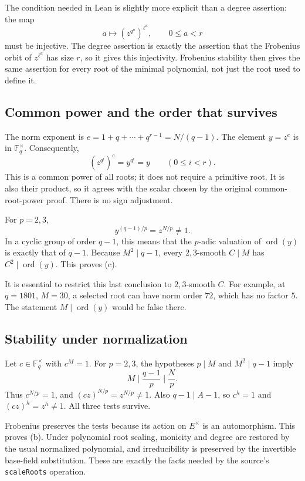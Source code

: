 \documentclass[11pt,a4paper]{article}
\theoremstyle{definition}
\theoremstyle{remark}
\newcommand{\F}{\mathbb F}
\newcommand{\ord}{\operatorname{ord}}
\newcommand{\code}[1]{{\small\nolinkurl{#1}}}
\begin{document}
The condition needed in Lean is slightly more explicit than a degree assertion:
the map
\[
    a\longmapsto (z^{q^a})^{\ell^u},\qquad 0\le a<r
\]
must be injective. The degree assertion is exactly the assertion that the
Frobenius orbit of \(z^{\ell^u}\) has size \(r\), so it gives this injectivity.
Frobenius stability then gives the same assertion for every root of the minimal
polynomial, not just the root used to define it.

\subsection{Common power and the order that survives}

The norm exponent is \(e=1+q+\cdots+q^{r-1}=N/(q-1)\).
The element \(y=z^e\) is in \(\F_q^\times\). Consequently,
\[
       (z^{q^i})^e=y^{q^i}=y
       \qquad(0\le i<r).
\]
This is a common power of all roots; it does not require a primitive root.
It is also their product, so it agrees with the scalar chosen by the original
common-root-power proof. There is no sign adjustment.

For \(p=2,3\),
\[
             y^{(q-1)/p}=z^{N/p}\ne1.
\]
In a cyclic group of order \(q-1\), this means that the \(p\)-adic valuation of
\(\ord(y)\) is exactly that of \(q-1\).
Because \(M^2\mid q-1\), every \(2,3\)-smooth \(C\mid M\) has
\(C^2\mid\ord(y)\). This proves (c).

It is essential to restrict this last conclusion to \(2,3\)-smooth \(C\).
For example, at \(q=1801\), \(M=30\), a selected root can have norm order \(72\),
which has no factor \(5\). The statement \(M\mid\ord(y)\) would be false there.

\subsection{Stability under normalization}

Let \(c\in\F_q^\times\) with \(c^M=1\).
For \(p=2,3\), the hypotheses \(p\mid M\) and \(M^2\mid q-1\) imply
\[
                  M\mid\frac{q-1}{p}\mid\frac{N}{p}.
\]
Thus \(c^{N/p}=1\), and
\((cz)^{N/p}=z^{N/p}\ne1\).
Also \(q-1\mid A-1\), so \(c^h=1\) and
\((cz)^h=z^h\ne1\).
All three tests survive.

Frobenius preserves the tests because its action on \(E^\times\) is an
automorphism. This proves (b). Under polynomial root scaling, monicity and degree
are restored by the usual normalized polynomial, and irreducibility is preserved
by the invertible base-field substitution. These are exactly the facts needed by
the source's \code{scaleRoots} operation.
\end{document}
